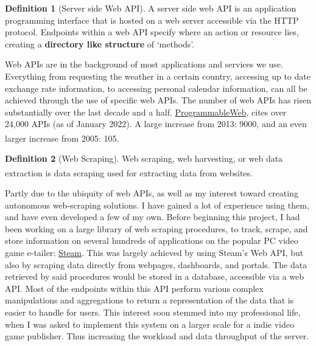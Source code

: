 \documentclass[]{full}
\theoremstyle{definition}
\newtheorem{definition}{Definition}[subsubsection]
\begin{document}
\begin{definition}[Server side Web API]
    A server side web API is an application programming interface that is hosted on a web server accessible via the HTTP protocol. Endpoints within a web API specify where an action or resource lies, creating a \textbf{directory like structure} of `methods'.
\end{definition}

Web APIs are in the background of most applications and services we use. Everything from requesting the weather in a certain country, accessing up to date exchange rate information, to accessing personal calendar information, can all be achieved through the use of specific web APIs. The number of web APIs has risen substantially over the last decade and a half. \href{https://www.programmableweb.com/category/all/apis}{ProgrammableWeb}, cites over 24,000 APIs (as of January 2022). A large increase from 2013: 9000, and an even larger increase from 2005: 105\textsuperscript{\cite{duvander_2013}}.

\begin{definition}[Web Scraping]
    Web scraping, web harvesting, or web data extraction is data scraping used for extracting data from websites\textsuperscript{\cite{web_scraping_wikipedia_2022}}.
\end{definition}

Partly due to the ubiquity of web APIs, as well as my interest toward creating autonomous web-scraping solutions. I have gained a lot of experience using them, and have even developed a few of my own. Before beginning this project, I had been working on a large library of web scraping procedures, to track, scrape, and store information on several hundreds of applications on the popular PC video game e-tailer: \href{https://store.steampowered.com/}{Steam}. This was largely achieved by using Steam's Web API, but also by scraping data directly from webpages, dashboards, and portals. The data retrieved by said procedures would be stored in a database, accessible via a web API. Most of the endpoints within this API perform various complex manipulations and aggregations to return a representation of the data that is easier to handle for users. This interest soon stemmed into my professional life, when I was asked to implement this system on a larger scale for a indie video game publisher. Thus increasing the workload and data throughput of the server.
\end{document}

